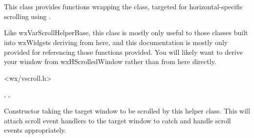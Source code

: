 
\section{}\label{wxvarhscrollhelper}

This class provides functions wrapping the 
 class, targeted for
horizontal-specific scrolling using .

Like wxVarScrollHelperBase, this class is mostly only useful to those classes
built into wxWidgets deriving from here, and this documentation is mostly
only provided for referencing those functions provided. You will likely want
to derive your window from wxHScrolledWindow rather than from here directly.




<wx/vscroll.h>


,
\rtfsp{},
\rtfsp{}



\label{wxvarhscrollhelperwxvarhscrollhelper}


Constructor taking the target window to be scrolled by this helper class.
This will attach scroll event handlers to the target window to catch and
handle scroll events appropriately.


\label{wxvarhscrollhelperestimatetotalwidth}



